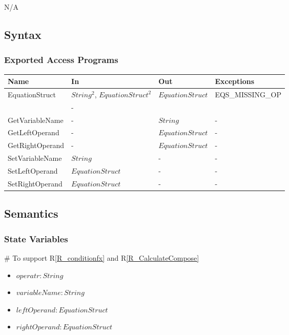 \documentclass[12pt, titlepage]{article}
\newcommand{\rref}[1]{R\ref{#1}}
\begin{document}
N/A

\subsection{Syntax}

\subsubsection{Exported Access Programs}

\begin{center}
	\begin{tabular}{p{3cm} p{3cm} p{3cm} p{5cm}}
		\hline
		\textbf{Name} & \textbf{In} & \textbf{Out} & \textbf{Exceptions} \\
		\hline
		\multirow{2}{3cm}{EquationStruct} & $String^2$, $EquationStruct^2$ & 
		\multirow{2}{3cm}{$EquationStruct$} & 
		\multirow{2}{5cm}{EQS\_MISSING\_OP}\\
		GetOperator & - & $String$ & - \\
		GetVariableName & - & $String$ & - \\
		GetLeftOperand & - & $EquationStruct$ & -\\
		GetRightOperand & - & $EquationStruct$ & - \\
		SetVariableName & $String$ & - & - \\
		SetLeftOperand & $EquationStruct$ & - & - \\
		SetRightOperand & $EquationStruct$ & - & - \\
		\hline
	\end{tabular}
\end{center}

\subsection{Semantics}

\subsubsection{State Variables}

\# To support \rref{R_conditionfx} and \rref{R_CalculateCompose}
\begin{itemize}
	\item $operatr : String$
	\item $variableName : String$
	\item $leftOperand : EquationStruct$
	\item $rightOperand : EquationStruct$
\end{itemize}
\end{document}
